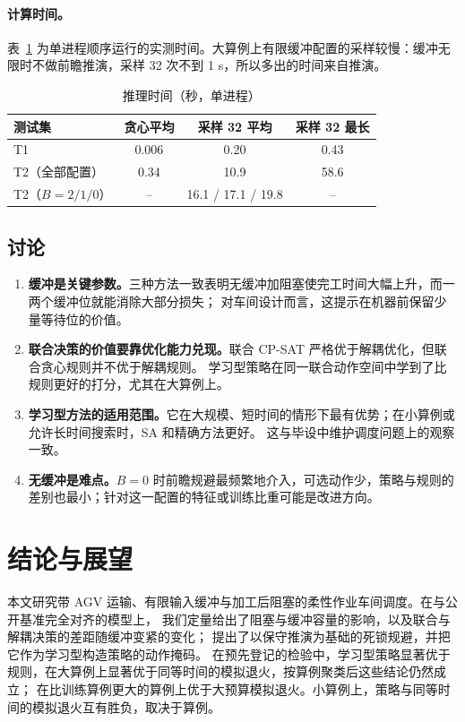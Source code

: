 \documentclass[11pt,a4paper]{ctexart}
\theoremstyle{definition}
\theoremstyle{remark}
\begin{document}
\paragraph{计算时间。}表~\ref{tab:time} 为单进程顺序运行的实测时间。大算例上有限缓冲配置的采样较慢：缓冲无限时不做前瞻推演，采样 32 次不到 1 s，所以多出的时间来自推演。

\begin{table}[ht]
\centering
\caption{推理时间（秒，单进程）}
\label{tab:time}
\small
\begin{tabular}{lccc}
\toprule
测试集 & 贪心平均 & 采样 32 平均 & 采样 32 最长 \\
\midrule
T1 & 0.006 & 0.20 & 0.43 \\
T2（全部配置） & 0.34 & 10.9 & 58.6 \\
T2（$B=2/1/0$） & -- & 16.1 / 17.1 / 19.8 & -- \\
\bottomrule
\end{tabular}
\end{table}

\subsection{讨论}

\begin{enumerate}[nosep]
  \item \textbf{缓冲是关键参数。}三种方法一致表明无缓冲加阻塞使完工时间大幅上升，而一两个缓冲位就能消除大部分损失；
        对车间设计而言，这提示在机器前保留少量等待位的价值。
  \item \textbf{联合决策的价值要靠优化能力兑现。}联合 CP-SAT 严格优于解耦优化，但联合贪心规则并不优于解耦规则。
        学习型策略在同一联合动作空间中学到了比规则更好的打分，尤其在大算例上。
  \item \textbf{学习型方法的适用范围。}它在大规模、短时间的情形下最有优势；在小算例或允许长时间搜索时，SA 和精确方法更好。
        这与毕设中维护调度问题上的观察一致。
  \item \textbf{无缓冲是难点。}$B=0$ 时前瞻规避最频繁地介入，可选动作少，策略与规则的差别也最小；针对这一配置的特征或训练比重可能是改进方向。
\end{enumerate}

\section{结论与展望}

本文研究带 AGV 运输、有限输入缓冲与加工后阻塞的柔性作业车间调度。在与公开基准完全对齐的模型上，
我们定量给出了阻塞与缓冲容量的影响，以及联合与解耦决策的差距随缓冲变紧的变化；
提出了以保守推演为基础的死锁规避，并把它作为学习型构造策略的动作掩码。
在预先登记的检验中，学习型策略显著优于规则，在大算例上显著优于同等时间的模拟退火，按算例聚类后这些结论仍然成立；
在比训练算例更大的算例上优于大预算模拟退火。小算例上，策略与同等时间的模拟退火互有胜负，取决于算例。
\end{document}
